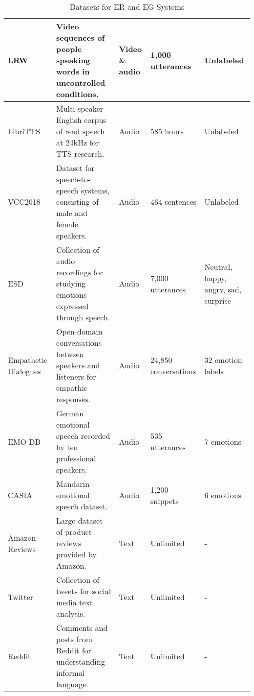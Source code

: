 \begin{table}[H]
\begin{tabular}{|p{3cm}|p{5cm}|p{2cm}|p{2cm}|p{3cm}|}
LRW & Video sequences of people speaking words in uncontrolled conditions. & Video \& audio & 1,000 utterances & Unlabeled \\ \hline

LibriTTS & Multi-speaker English corpus of read speech at 24kHz for TTS research. & Audio & 585 hours & Unlabeled \\ \hline

VCC2018 & Dataset for speech-to-speech systems, consisting of male and female speakers. & Audio & 464 sentences & Unlabeled \\ \hline

ESD & Collection of audio recordings for studying emotions expressed through speech. & Audio & 7,000 utterances & Neutral, happy, angry, sad, surprise \\ \hline

Empathetic Dialogues & Open-domain conversations between speakers and listeners for empathic responses. & Audio & 24,850 conversations & 32 emotion labels \\ \hline

EMO-DB & German emotional speech recorded by ten professional speakers. & Audio & 535 utterances & 7 emotions \\ \hline

CASIA & Mandarin emotional speech dataset. & Audio & 1,200 snippets & 6 emotions \\ \hline

Amazon Reviews & Large dataset of product reviews provided by Amazon. & Text & Unlimited & - \\ \hline

Twitter & Collection of tweets for social media text analysis. & Text & Unlimited & - \\ \hline

Reddit & Comments and posts from Reddit for understanding informal language. & Text & Unlimited & - \\ \hline

\end{tabular}
\caption{Datasets for ER and EG Systems}
\label{tab:datasets}
\end{table}
